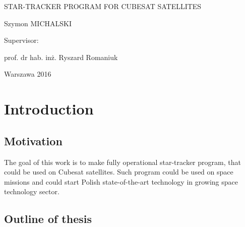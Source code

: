\documentclass[12pt,a4paper,oneside]{article}
\begin{document}
\begin{titlepage}
	\vspace{0.2cm}
	{\huge STAR-TRACKER PROGRAM FOR CUBESAT SATELLITES\par}
	\vspace{0.2cm}
	{\large Szymon MICHALSKI\par}
	\vspace{3cm}
	\begin{flushright}
	Supervisor:\par
	prof. dr hab. inż. Ryszard Romaniuk\par
	\end{flushright}
	\vspace{6cm}
	{\large Warszawa 2016\par}
\end{titlepage}

\setcounter{page}{2}


\newpage
\setlength{\parindent}{1cm}
\setlength{\parskip}{\baselineskip}%


\printnomenclature

\newpage

\section{Introduction}
\subsection{Motivation}
The goal of this work is to make fully operational star-tracker program, that could be used on Cubesat satellites. Such program could be used on space missions and could start Polish state-of-the-art technology in growing space technology sector.

\subsection{Outline of thesis}
\end{document}
